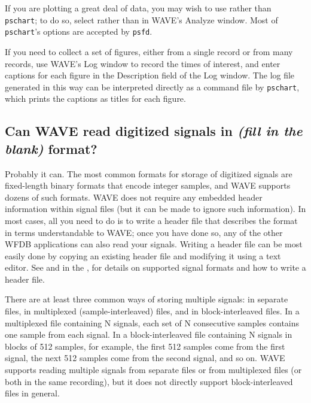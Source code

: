 \documentclass[twoside]{book}
\newcommand{\button}[1]{\cornersize{2}\ovalbox{\rule[-.3mm]{0cm}{2.5mm}\small\sf ~#1~}}
\newcommand{\WAVE}{{\sf WAVE}\xspace}
\begin{document}
If you are plotting a great deal of data, you may wish to use
rather than {\tt pschart};  to do so, select \button{Print full disclosure}
rather than \button{Print chart} in \WAVE{}'s {\sf Analyze} window.  Most of
{\tt pschart}'s options are accepted by {\tt psfd}.

If you need to collect a set of figures, either from a single record or from
many records, use \WAVE{}'s {\sf Log} window to record the times of interest,
and enter captions for each figure in the {\sf Description} field of the
{\sf Log} window.  The log file generated in this way can be interpreted
directly as a command file by {\tt pschart}, which prints the captions as
titles for each figure.

\subsection{Can \WAVE{} read digitized signals in \emph{(fill in the blank)}
format?}

Probably it can.  The most common formats for storage of digitized
signals are fixed-length binary formats that encode integer samples,
and \WAVE{} supports dozens of such formats.  \WAVE{} does not require
any embedded header information within signal files (but it can be
made to ignore such information).  In most cases, all you need to do
is to write a header file that describes the format in terms
understandable to \WAVE{}; once you have done so, any of the other WFDB
applications can also read your signals.  Writing a header file can be
most easily done by copying an existing header file and modifying it
using a text editor.  See 
 and
 in the
,
for details on supported signal formats and how to write a header file.

There are at least three common ways of storing multiple signals: in
separate files, in multiplexed (sample-interleaved) files, and in
block-interleaved files.  In a multiplexed file containing N signals,
each set of N consecutive samples contains one sample from each
signal.  In a block-interleaved file containing N signals in blocks of
512 samples, for example, the first 512 samples come from the first
signal, the next 512 samples come from the second signal, and so on.
\WAVE{} supports reading multiple signals from separate files or from
multiplexed files (or both in the same recording), but it does not
directly support block-interleaved files in general.
\end{document}
